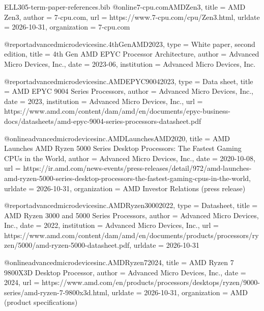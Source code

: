 \begin{filecontents*}[overwrite]{ELL305-term-paper-references.bib}
@online{7-cpu.comAMDZen3,
  title = {{{AMD Zen3}}},
  author = {{7-cpu.com}},
  url = {https://www.7-cpu.com/cpu/Zen3.html},
  urldate = {2026-10-31},
  organization = {7-cpu.com}
}

@report{advancedmicrodevicesinc.4thGenAMD2023,
  type = {White paper, second edition},
  title = {4th {{Gen AMD EPYC Processor Architecture}}},
  author = {{Advanced Micro Devices, Inc.}},
  date = {2023-06},
  institution = {Advanced Micro Devices, Inc.}
}

@report{advancedmicrodevicesinc.AMDEPYC90042023,
  type = {Data sheet},
  title = {{{AMD EPYC}} 9004 {{Series Processors}}},
  author = {{Advanced Micro Devices, Inc.}},
  date = {2023},
  institution = {Advanced Micro Devices, Inc.},
  url = {https://www.amd.com/content/dam/amd/en/documents/epyc-business-docs/datasheets/amd-epyc-9004-series-processors-datasheet.pdf}
}

@online{advancedmicrodevicesinc.AMDLaunchesAMD2020,
  title = {{{AMD Launches AMD Ryzen}} 5000 {{Series Desktop Processors}}: {{The Fastest Gaming CPUs}} in the {{World}}},
  author = {{Advanced Micro Devices, Inc.}},
  date = {2020-10-08},
  url = {https://ir.amd.com/news-events/press-releases/detail/972/amd-launches-amd-ryzen-5000-series-desktop-processors-the-fastest-gaming-cpus-in-the-world},
  urldate = {2026-10-31},
  organization = {AMD Investor Relations (press release)}
}

@report{advancedmicrodevicesinc.AMDRyzen30002022,
  type = {Datasheet},
  title = {{{AMD Ryzen}} 3000 and 5000 {{Series Processors}}},
  author = {{Advanced Micro Devices, Inc.}},
  date = {2022},
  institution = {Advanced Micro Devices, Inc.},
  url = {https://www.amd.com/content/dam/amd/en/documents/products/processors/ryzen/5000/amd-ryzen-5000-datasheet.pdf},
  urldate = {2026-10-31}
}

@online{advancedmicrodevicesinc.AMDRyzen72024,
  title = {{{AMD Ryzen}} 7 {{9800X3D Desktop Processor}}},
  author = {{Advanced Micro Devices, Inc.}},
  date = {2024},
  url = {https://www.amd.com/en/products/processors/desktops/ryzen/9000-series/amd-ryzen-7-9800x3d.html},
  urldate = {2026-10-31},
  organization = {AMD (product specifications)}
}


\end{filecontents*}
